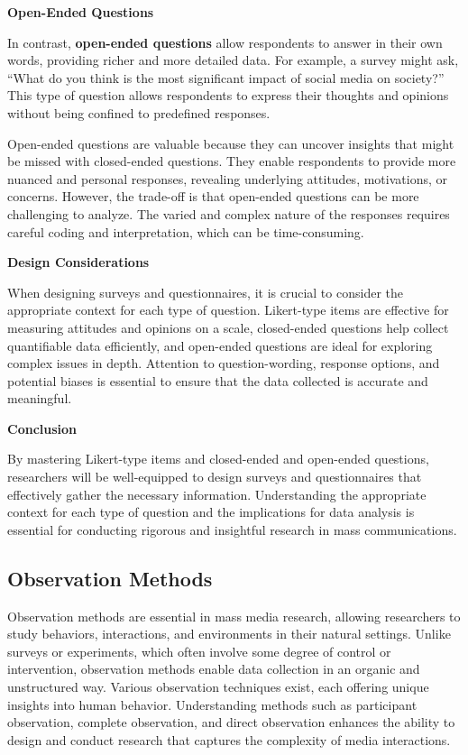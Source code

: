\documentclass[
]{book}
\begin{document}
\textbf{Open-Ended Questions}

In contrast, \textbf{open-ended questions} allow respondents to answer in their own words, providing richer and more detailed data. For example, a survey might ask, ``What do you think is the most significant impact of social media on society?'' This type of question allows respondents to express their thoughts and opinions without being confined to predefined responses.

Open-ended questions are valuable because they can uncover insights that might be missed with closed-ended questions. They enable respondents to provide more nuanced and personal responses, revealing underlying attitudes, motivations, or concerns. However, the trade-off is that open-ended questions can be more challenging to analyze. The varied and complex nature of the responses requires careful coding and interpretation, which can be time-consuming.

\textbf{Design Considerations}

When designing surveys and questionnaires, it is crucial to consider the appropriate context for each type of question. Likert-type items are effective for measuring attitudes and opinions on a scale, closed-ended questions help collect quantifiable data efficiently, and open-ended questions are ideal for exploring complex issues in depth. Attention to question-wording, response options, and potential biases is essential to ensure that the data collected is accurate and meaningful.

\textbf{Conclusion}

By mastering Likert-type items and closed-ended and open-ended questions, researchers will be well-equipped to design surveys and questionnaires that effectively gather the necessary information. Understanding the appropriate context for each type of question and the implications for data analysis is essential for conducting rigorous and insightful research in mass communications.

\subsection*{Observation Methods}\label{observation-methods}

Observation methods are essential in mass media research, allowing researchers to study behaviors, interactions, and environments in their natural settings. Unlike surveys or experiments, which often involve some degree of control or intervention, observation methods enable data collection in an organic and unstructured way. Various observation techniques exist, each offering unique insights into human behavior. Understanding methods such as participant observation, complete observation, and direct observation enhances the ability to design and conduct research that captures the complexity of media interactions.
\end{document}
